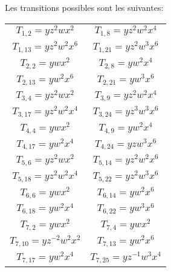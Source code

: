  Les transitions possibles sont les suivantes:
 \small
\begin{longtable}{|c|c|} 
\hline
$T_{1,2}= yz^2wx^2$\quad\quad \quad &

$T_{1,8}= yz^2w^2x^4$\\

$T_{1,13}= yz^2w^2x^6$ &

$T_{1,21}= yz^2w^3x^6$\\

$T_{2,2}= ywx^2$&

$T_{2,8}= yw^2x^4$\\

$T_{2,13}= yw^2x^6$&

$T_{2,21}= yw^3x^6$\\

$T_{3,4}= yz^2wx^2$&

$T_{3,9}= yz^2w^2x^4$\\

$T_{3,17}= yz^2w^2x^4$&

$T_{3,24}= yz^3w^3x^6$\\

$T_{4,4}= ywx^2$&

$T_{4,9}= yw^2x^4$\\

$T_{4,17}= yw^2x^4$&

$T_{4,24}= yzw^3x^6$\\

$T_{5,6}= yz^2wx^2$&

$T_{5,14}= yz^2w^2x^6$\\

$T_{5,18}= yz^2w^2x^4$&

$T_{5,22}= yz^2w^3x^6$\\

$T_{6,6}= ywx^2$&

$T_{6,14}= yw^2x^6$\\

$T_{6,18}= yw^2x^4$&

$T_{6,22}= yw^3x^6$\\

$T_{7,2}= ywx^2$&

$T_{7,4}= ywx^2$\\

$T_{7,10}= yz^{-2}w^2x^2$&

$T_{7,13}= yw^2x^6$\\

$T_{7,17}= yw^2x^4$&

$T_{7,25}= yz^{-1}w^3x^4$\\


\end{longtable}
